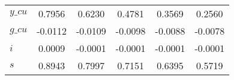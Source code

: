 \begin{center}
\begin{longtable}{lccccc}
$y\_cu          $	 & 	     0.7956	 & 	     0.6230	 & 	     0.4781	 & 	     0.3569	 & 	     0.2560 \\ 
$g\_cu          $	 & 	    -0.0112	 & 	    -0.0109	 & 	    -0.0098	 & 	    -0.0088	 & 	    -0.0078 \\ 
${i}            $	 & 	     0.0009	 & 	    -0.0001	 & 	    -0.0001	 & 	    -0.0001	 & 	    -0.0001 \\ 
${s}            $	 & 	     0.8943	 & 	     0.7997	 & 	     0.7151	 & 	     0.6395	 & 	     0.5719 \\ 
\end{longtable}
 \end{center}

